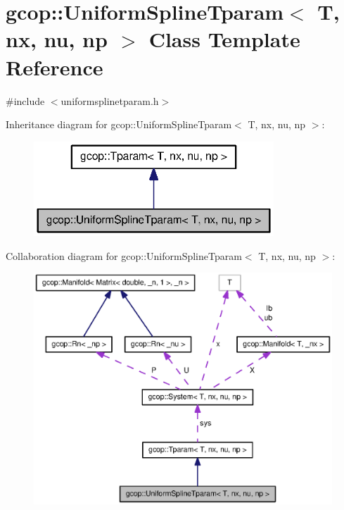 \section{gcop\-:\-:\-Uniform\-Spline\-Tparam$<$ \-T, nx, nu, np $>$ \-Class \-Template \-Reference}
\label{classgcop_1_1UniformSplineTparam}


{\ttfamily \#include $<$uniformsplinetparam.\-h$>$}



\-Inheritance diagram for gcop\-:\-:\-Uniform\-Spline\-Tparam$<$ \-T, nx, nu, np $>$\-:\nopagebreak
\begin{figure}[H]
\begin{center}
\leavevmode
\includegraphics[width=256pt]{classgcop_1_1UniformSplineTparam__inherit__graph}
\end{center}
\end{figure}


\-Collaboration diagram for gcop\-:\-:\-Uniform\-Spline\-Tparam$<$ \-T, nx, nu, np $>$\-:\nopagebreak
\begin{figure}[H]
\begin{center}
\leavevmode
\includegraphics[width=350pt]{classgcop_1_1UniformSplineTparam__coll__graph}
\end{center}
\end{figure}
